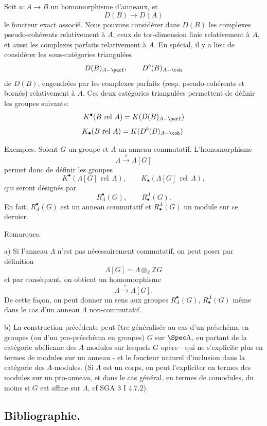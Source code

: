 Soit $u:A\to B$ un homomorphisme d'anneaux, et
\[
D(B)\longrightarrow D(A)
\]
le foncteur exact associé. Nous pouvons considérer dans $D(B)$ les complexes pseudo-cohérents relativement à $A$, ceux de tor-dimension finie relativement à $A$, et aussi les complexes parfaits relativement à $A$. En spécial, il y a lieu de considérer les sous-catégories triangulées
\[
D(B)_{A-\parf},\qquad D^b(B)_{A-\coh}
\]
de $D(B)$, engendrées par les complexes parfaits (resp. pseudo-cohérents et bornés) relativement à $A$. Ces deux catégories triangulées permettent de définir les groupes suivants:
\[
K^{\bullet}(B\operatorname{\,rel\,}A)=K(D(B)_{A-\parf})
\]
\[
K_\bullet(B\operatorname{\,rel\,}A)=K(D^b(B)_{A-\coh}).
\]

Exemples. Soient $G$ un groupe et $\Lambda$ un anneau commutatif. L'homomorphisme
\[
\Lambda\xrightarrow{\varepsilon}\Lambda[G]
\]
permet donc de définir les groupes
\[
K^{\bullet}(\Lambda[G]\operatorname{\,rel\,}\Lambda),\qquad
K_\bullet(\Lambda[G]\operatorname{\,rel\,}\Lambda),
\]
qui seront désignés par
\[
R^{\bullet}_\Lambda(G),\qquad R^\Lambda_\bullet(G).
\]
En fait, $R^{\bullet}_\Lambda(G)$ est un anneau commutatif et $R^\Lambda_\bullet(G)$ un module sur ce dernier.

Remarques.

a) Si l'anneau $\Lambda$ n'est pas nécessairement commutatif, on peut poser par définition
\[
\Lambda[G]=\Lambda\otimes_{\mathbb{Z}}\mathbb{Z}G
\]
et par conséquent, on obtient un homomorphisme
\[
\Lambda\xrightarrow{\varepsilon}\Lambda[G].
\]
De cette façon, on peut donner un sens aux groupes $R^{\bullet}_\Lambda(G)$, $R^\Lambda_\bullet(G)$ même dans le cas d'un anneau $\Lambda$ non-commutatif.

b) La construction précédente peut être généralisée au cas d'un préschéma en groupes (ou d'un pro-préschéma en groupes) $G$ sur $\Spec\Lambda$, en partant de la catégorie abélienne des $\Lambda$-modules sur lesquels $G$ opère - qui ne s'explicite plus en termes de modules sur un anneau - et le foncteur naturel d'inclusion dans la catégorie des $\Lambda$-modules. (Si $\Lambda$ est un corps, on peut l'expliciter en termes des modules sur un pro-anneau, et dans le cas général, en termes de comodules, du moins si $G$ est affine sur $\Lambda$, cf SGA 3 I 4.7.2).

\subsection*{Bibliographie.}

